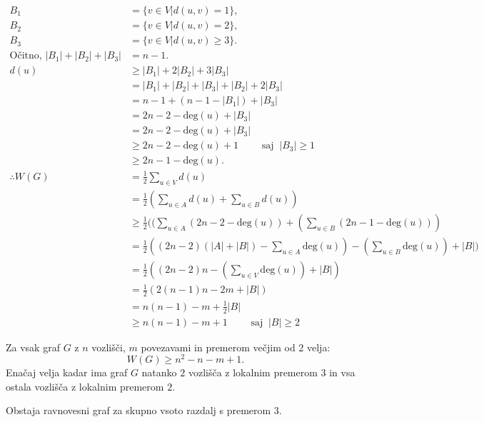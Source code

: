 \documentclass[fin1, tisk]{fmfdelo}
\begin{document}
\begin{dokaz}
\begin{align*}
B_1 &= \{v \in V | d(u,v) = 1\}, \\
B_2 &= \{v \in V | d(u,v) = 2\}, \\
B_3 &= \{v \in V | d(u,v) \geq 3\}. \\
\text{Očitno, } |B_1| + |B_2| + |B_3| &= n - 1. \\
d(u) &\geq |B_1| + 2|B_2| + 3|B_3| \\
&= |B_1| + |B_2| + |B_3| + |B_2| + 2|B_3| \\
&= n - 1+ (n - 1 - |B_1|)+ | B_3| \\
&= 2n-2-\text{deg}(u) + | B_3| \\
&= 2n-2-\text{deg}(u) + | B_3| \\
&\geq 2n-2-\text{deg}(u)+1 \qquad \text{ saj } \ |B_3| \geq 1 \\
&\geq 2n-1-\text{deg}(u). \\
\therefore W(G) &= \frac{1}{2} \sum_{u \in V} d(u) \\
&=\frac{1}{2}(\sum_{u \in A} d(u) + \sum_{u \in B} d(u)) \\
&\geq \frac{1}{2}((\sum_{u \in A} (2n-2-\text{deg}(u))+(\sum_{u \in B} (2n-1-\text{deg}(u))) \\
&=\frac{1}{2}((2n-2)(|A| + |B|) - \sum_{u \in A} \text{deg}(u))-(\sum_{u \in B} \text{deg}(u))+ |B|) \\
&=\frac{1}{2}((2n-2)n - (\sum_{u \in V} \text{deg}(u)) + |B|) \\
&=\frac{1}{2}(2(n-1)n - 2m + |B|) \\
&=n(n - 1) - m + \frac{1}{2}|B| \\
&\geq n(n - 1) - m + 1  \qquad \text{ saj } \ |B| \geq 2
\end{align*}

\end{dokaz}


\begin{posledica}
Za vsak graf $G$ z $n$ vozlišči, $m$ povezavami in premerom večjim od $2$ velja:
$$W(G) \geq n^2 - n - m + 1.$$
Enačaj velja kadar ima graf $G$ natanko $2$ vozlišča z lokalnim premerom $3$ in vsa ostala vozlišča z lokalnim premerom $2$.
\end{posledica}

\begin{dokaz}

\end{dokaz}


\begin{izrek}
Obstaja ravnovesni graf za skupno vsoto razdalj s premerom $3$.
\end{izrek}
\end{document}
